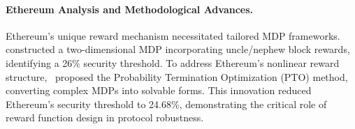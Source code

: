
\paragraph{Ethereum Analysis and Methodological Advances.}
Ethereum's unique reward mechanism necessitated tailored MDP frameworks.
\cite{feng2019selfish} constructed a two-dimensional MDP incorporating uncle/nephew block rewards, identifying a 26\% security threshold. 
To address Ethereum's nonlinear reward structure,~\cite{zur2020efficient} proposed the Probability Termination Optimization (PTO) method, converting complex MDPs into solvable forms. 
This innovation reduced Ethereum's security threshold to 24.68\%, demonstrating the critical role of reward function design in protocol robustness.


